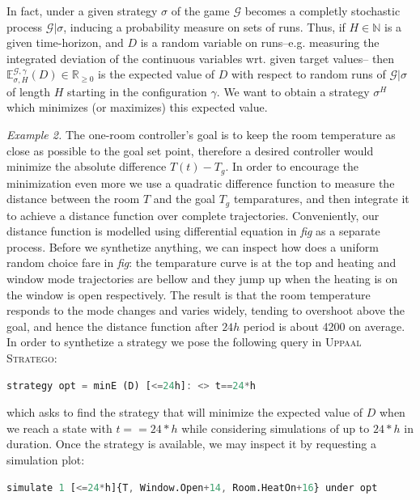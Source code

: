     In fact, under a given strategy $\sigma$ of the game $\mathcal{G}$ becomes a completly 
    stochastic process $\mathcal{G}|\sigma$, inducing a probability measure on sets of runs.
    Thus, if $H \in \mathbb{N}$ is a given time-horizon, and $D$ is a random variable on runs--e.g.
    measuring the integrated deviation of the continuous variables wrt. given target values--
    then $\mathbb{E}^{\mathcal{G,\gamma}}_{\sigma,H}(D) \in \mathbb{R}_{\geqslant 0}$ is 
    the expected value of $D$ with respect to random runs of $\mathcal{G}|\sigma$ of length
    $H$ starting in the configuration $\gamma$. We want to obtain a strategy $\sigma^H$ which
    minimizes (or maximizes) this expected value.

    \emph{Example 2.} The one-room controller's goal is to keep the room temperature as 
    close as possible to the goal set point, therefore a desired controller would minimize 
    the absolute difference $T(t)-T_g$. In order to encourage the minimization even more
    we use a quadratic difference function to measure the distance between the room $T$ 
    and the goal $T_g$ temparatures, and then integrate it to achieve a distance function 
    over complete trajectories. Conveniently, our distance function is modelled using 
    differential equation in \emph{fig} as a separate process. Before we synthetize anything,
    we can inspect how does a uniform random choice fare in \emph{fig}: the temparature curve 
    is at the top and heating and window  mode trajectories are bellow and they jump up
    when the heating is on the window is open respectively. The result is that the room 
    temperature responds to the mode changes and varies widely, tending to overshoot above the
    goal, and hence the distance function after $24h$ period is about 4200 on average. In order
    to synthetize a strategy we pose the following query in \textsc{Uppaal Stratego}:

    \begin{lstlisting}[language=Octave]
        strategy opt = minE (D) [<=24h]: <> t==24*h
    \end{lstlisting}

    which asks to find the strategy that will minimize the expected value of $D$ when we reach
    a state with $t == 24*h$ while considering simulations of up to $24*h$ in duration. Once
    the strategy is available, we may inspect it by requesting a simulation plot:

    \begin{lstlisting}[language=Octave]
        simulate 1 [<=24*h]{T, Window.Open+14, Room.HeatOn+16} under opt
    \end{lstlisting}

